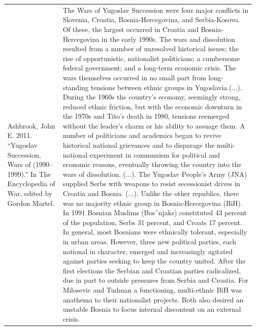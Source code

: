 {\begin{longtable}{p{}p{}}
Ashbrook, John E. 2011. “Yugoslav Succession, Wars of (1990–1999).” In The Encyclopedia of War, edited by Gordon Martel. & The Wars of Yugoslav Succession were four major conflicts in Slovenia, Croatia, Bosnia-Hercegovina, and Serbia-Kosovo. Of these, the largest occurred in Croatia and Bosnia-Hercegovina in the early 1990s. The wars and dissolution resulted from a number of unresolved historical issues; the rise of opportunistic, nationalist politicians; a cumbersome federal government; and a long-term economic crisis. The wars themselves occurred in no small part from long-standing tensions between ethnic groups in Yugoslavia.(...). During the 1960s the country's economy, seemingly strong, reduced ethnic friction, but with the economic downturn in the 1970s and Tito's death in 1980, tensions reemerged without the leader's charm or his ability to assuage them. A number of politicians and academics began to revive historical national grievances and to disparage the multi-national experiment in communism for political and economic reasons, eventually throwing the country into the wars of dissolution. (...). The Yugoslav People's Army (JNA) supplied Serbs with weapons to resist secessionist drives in Croatia and Bosnia. (...). Unlike the other republics, there was no majority ethnic group in Bosnia-Hercegovina (BiH). In 1991 Bosnian Muslims (Bosˇnjaks) constituted 43 percent of the population, Serbs 31 percent, and Croats 17 percent. In general, most Bosnians were ethnically tolerant, especially in urban areas. However, three new political parties, each national in character, emerged and increasingly agitated against parties seeking to keep the country united. After the first elections the Serbian and Croatian parties radicalized, due in part to outside pressures from Serbia and Croatia. For Milosevic and Tudman a functioning, multi-ethnic BiH was anathema to their nationalist projects. Both also desired an unstable Bosnia to focus internal discontent on an external crisis.
\\

\end{longtable}}
